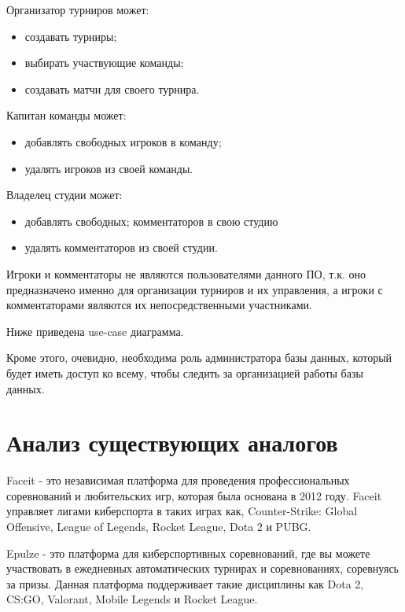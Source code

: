 Организатор турниров может:
\begin{itemize}
	\item создавать турниры;
	\item выбирать участвующие команды;
	\item создавать матчи для своего турнира.
\end{itemize}

Капитан команды может:
\begin{itemize}
	\item добавлять свободных игроков в команду;
	\item удалять игроков из своей команды.
\end{itemize}

Владелец студии может:
\begin{itemize}
	\item добавлять свободных; комментаторов в свою студию
	\item удалять комментаторов из своей студии.
\end{itemize}

Игроки и комментаторы не являются пользователями данного ПО, т.к. оно предназначено именно для организации турниров и их управления, а игроки с комментаторами являются их непосредственными участниками.

\newpage
Ниже приведена use-case диаграмма.


Кроме этого, очевидно, необходима роль администратора базы данных, который будет иметь доступ ко всему, чтобы следить за организацией работы базы данных.


\section{Анализ существующих аналогов}


Faceit - это независимая платформа для проведения профессиональных соревнований и любительских игр, которая была основана в 2012 году. Faceit управляет лигами киберспорта в таких играх как, Counter-Strike: Global Offensive, League of Legends, Rocket League, Dota 2 и PUBG.


Epulze - это платформа для киберспортивных соревнований, где вы можете участвовать в ежедневных автоматических турнирах и соревнованиях, соревнуясь за призы. Данная платформа поддерживает такие дисциплины как Dota 2, CS:GO, Valorant, Mobile Legends и Rocket League.


